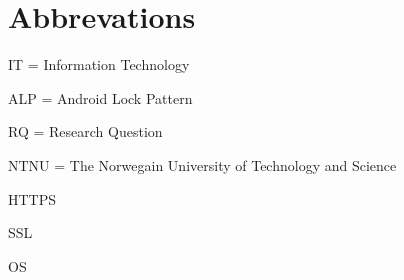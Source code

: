 \section*{Abbrevations}

	IT = Information Technology

	ALP = Android Lock Pattern
	
	RQ = Research Question

	NTNU = The Norwegain University of Technology and Science

	HTTPS

	SSL 

	OS

	
